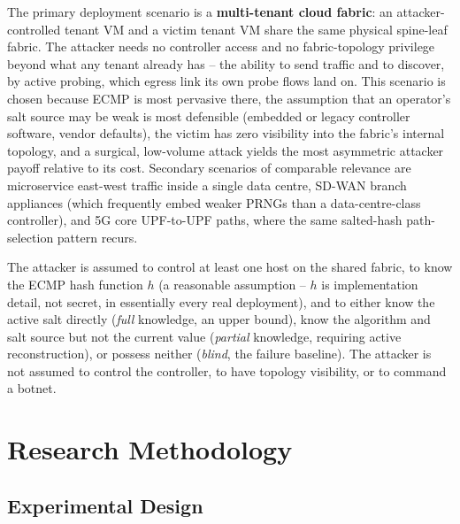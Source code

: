 \documentclass[conference]{IEEEtran}
\begin{document}
The primary deployment scenario is a \textbf{multi-tenant cloud fabric}: an attacker-controlled tenant VM and a
victim tenant VM share the same physical spine-leaf fabric. The attacker needs no controller access and no
fabric-topology privilege beyond what any tenant already has -- the ability to send traffic and to discover,
by active probing, which egress link its own probe flows land on. This scenario is chosen because ECMP is most
pervasive there, the assumption that an operator's salt source may be weak is most defensible (embedded or
legacy controller software, vendor defaults), the victim has zero visibility into the fabric's internal
topology, and a surgical, low-volume attack yields the most asymmetric attacker payoff relative to its cost.
Secondary scenarios of comparable relevance are microservice east-west traffic inside a single data centre,
SD-WAN branch appliances (which frequently embed weaker PRNGs than a data-centre-class controller), and 5G core
UPF-to-UPF paths, where the same salted-hash path-selection pattern recurs.

The attacker is assumed to control at least one host on the shared fabric, to know the ECMP hash function $h$
(a reasonable assumption -- $h$ is implementation detail, not secret, in essentially every real deployment), and
to either know the active salt directly (\emph{full} knowledge, an upper bound), know the algorithm and salt
source but not the current value (\emph{partial} knowledge, requiring active reconstruction), or possess neither
(\emph{blind}, the failure baseline). The attacker is not assumed to control the controller, to have topology
visibility, or to command a botnet.

\section{Research Methodology}

\subsection{Experimental Design}
\end{document}
